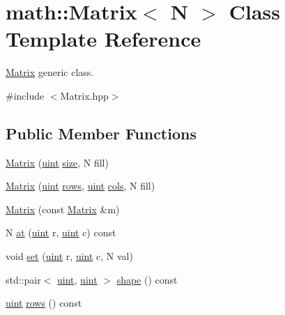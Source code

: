\hypertarget{classmath_1_1Matrix}{}\section{math\+:\+:Matrix$<$ N $>$ Class Template Reference}
\label{classmath_1_1Matrix}


\hyperlink{classmath_1_1Matrix}{Matrix} generic class.  




{\ttfamily \#include $<$Matrix.\+hpp$>$}

\subsection*{Public Member Functions}
\begin{DoxyCompactItemize}
\item 
\hyperlink{classmath_1_1Matrix_a766801644c0b1118db51d3d107daa732}{Matrix} (\hyperlink{typedefs_8h_a7b9b9413622e67b9df7f2d090b48682b}{uint} \hyperlink{classmath_1_1Matrix_ae99135c51efc0077b694ab37ad64d5c0}{size}, N fill)
\item 
\hyperlink{classmath_1_1Matrix_a0ba68b8b43efb8402dbecc0531df0bb5}{Matrix} (\hyperlink{typedefs_8h_a7b9b9413622e67b9df7f2d090b48682b}{uint} \hyperlink{classmath_1_1Matrix_a602173645d806afe305ed77b1ff38273}{rows}, \hyperlink{typedefs_8h_a7b9b9413622e67b9df7f2d090b48682b}{uint} \hyperlink{classmath_1_1Matrix_ad78b49e12a607856df124a18a855aaf1}{cols}, N fill)
\item 
\hyperlink{classmath_1_1Matrix_a24169476532305f1bb8229653274a5ba}{Matrix} (const \hyperlink{classmath_1_1Matrix}{Matrix} \&m)
\item 
N \hyperlink{classmath_1_1Matrix_aac510ef186a6bbf176d0ef4d79a7c666}{at} (\hyperlink{typedefs_8h_a7b9b9413622e67b9df7f2d090b48682b}{uint} r, \hyperlink{typedefs_8h_a7b9b9413622e67b9df7f2d090b48682b}{uint} c) const
\item 
void \hyperlink{classmath_1_1Matrix_afbf9ebd6114faec44e9eccb553ca8f33}{set} (\hyperlink{typedefs_8h_a7b9b9413622e67b9df7f2d090b48682b}{uint} r, \hyperlink{typedefs_8h_a7b9b9413622e67b9df7f2d090b48682b}{uint} c, N val)
\item 
std\+::pair$<$ \hyperlink{typedefs_8h_a7b9b9413622e67b9df7f2d090b48682b}{uint}, \hyperlink{typedefs_8h_a7b9b9413622e67b9df7f2d090b48682b}{uint} $>$ \hyperlink{classmath_1_1Matrix_afbbadd025c9d60f4447cee97fd7c727d}{shape} () const
\item 
\hyperlink{typedefs_8h_a7b9b9413622e67b9df7f2d090b48682b}{uint} \hyperlink{classmath_1_1Matrix_a602173645d806afe305ed77b1ff38273}{rows} () const

\end{DoxyCompactItemize}
